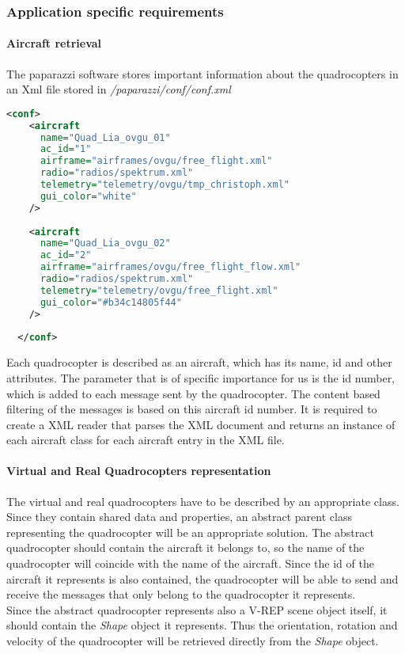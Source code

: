 \subsubsection{Application specific requirements}
\label{sec:requirementsApplication}

\paragraph{Aircraft retrieval}
\label{par:aircraftRetrieval}
The paparazzi software stores important information about the quadrocopters in an Xml file stored in \textit{/paparazzi/conf/conf.xml}

\begin{lstlisting}[basicstyle=\tiny, caption={Paparazzi aircraft configuration}, label={lst:AircraftXml}, language = Xml]
  <conf>
    <aircraft
      name="Quad_Lia_ovgu_01"
      ac_id="1"
      airframe="airframes/ovgu/free_flight.xml"
      radio="radios/spektrum.xml"
      telemetry="telemetry/ovgu/tmp_christoph.xml"
      gui_color="white"
    />
    
    <aircraft
      name="Quad_Lia_ovgu_02"
      ac_id="2"
      airframe="airframes/ovgu/free_flight_flow.xml"
      radio="radios/spektrum.xml"
      telemetry="telemetry/ovgu/free_flight.xml"
      gui_color="#b34c14805f44"
    />
  
  </conf>
\end{lstlisting}

Each quadrocopter is described as an aircraft, which has its name, id and other attributes. 
The parameter that is of specific importance for us is the id number, which is added to each message sent by the quadrocopter. 
The content based filtering of the messages is based on this aircraft id number. 
It is required to create a XML reader that parses the XML document and returns an instance of each aircraft class for each aircraft entry in the XML file.

\paragraph{Virtual and Real Quadrocopters representation}

The virtual and real quadrocopters have to be described by an appropriate class. \\
Since they contain shared data and properties, an abstract parent class representing the quadrocopter will be an appropriate solution. The abstract quadrocopter should contain the aircraft it belongs to, so the name of the quadrocopter will coincide with the name of the aircraft. Since the id of the aircraft it represents is also contained, the quadrocopter will be able to send and receive the messages that only belong to the quadrocopter it represents. \\
Since the abstract quadrocopter represents also a V-REP scene object itself, it should contain the \textit{Shape} object it represents. Thus the orientation, rotation and velocity of the quadrocopter will be retrieved directly from the \textit{Shape} object.\\

